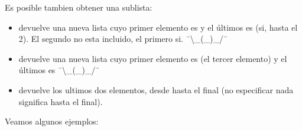 \documentclass[a4paper,12pt,spanish]{sphinxmanual}
\begin{document}
\sphinxAtStartPar
Es posible tambien obtener una sublista:
\begin{itemize}
\item {} 
\sphinxAtStartPar
{} devuelve una nueva lista cuyo primer elemento es
 y el últimos es  (si, hasta
el 2). El segundo  no esta incluido, el primero si. ¯\textbackslash{}\_(\sphinxhyphen{}\_\sphinxhyphen{})\_/¯

\item {} 
\sphinxAtStartPar
{} devuelve una nueva lista cuyo primer elemento es
 (el tercer elemento) y el últimos es
 ¯\textbackslash{}\_(\sphinxhyphen{}\_\sphinxhyphen{})\_/¯

\item {} 
\sphinxAtStartPar
{} devuelve los ultimos dos elementos, desde
 hasta el final (no especificar nada significa hasta
el final).

\end{itemize}

\sphinxAtStartPar
Veamos algunos ejemplos:
\end{document}
